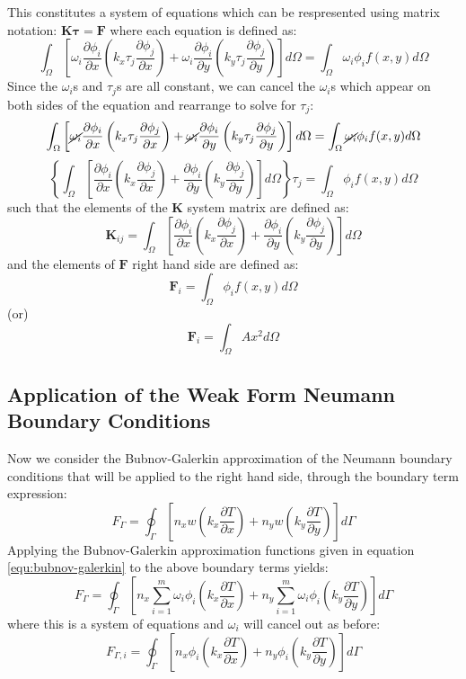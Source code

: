 \documentclass[letterpaper,10pt]{article}
\begin{document}
\noindent This constitutes a system of equations which can be respresented using matrix notation: $\mathbf{K}\mathbf{\tau}=\mathbf{F}$ where each equation is defined as:
\[
\int_\Omega \left[ \omega_i\frac{\partial \phi_i}{\partial x}\left(k_x\tau_j\frac{\partial \phi_j}{\partial x}\right) +  \omega_i\frac{\partial \phi_i}{\partial y}\left(k_y\tau_j\frac{\partial \phi_j}{\partial y}\right) \right]d\Omega = \int_\Omega \omega_i\phi_if(x,y)d\Omega
\]
Since the $\omega_i$s and $\tau_j$s are all constant, we can cancel the $\omega_i$s which appear on both sides of the equation and rearrange to solve for $\tau_j$:
\[
\int_\Omega \left[ \cancel{\omega_i}\frac{\partial \phi_i}{\partial x}\left(k_x\tau_j\frac{\partial \phi_j}{\partial x}\right) +  \cancel{\omega_i}\frac{\partial \phi_i}{\partial y}\left(k_y\tau_j\frac{\partial \phi_j}{\partial y}\right) \right]d\Omega = \int_\Omega \cancel{\omega_i}\phi_if(x,y)d\Omega
\]
\[
\left\{\int_\Omega \left[ \frac{\partial \phi_i}{\partial x}\left(k_x\frac{\partial \phi_j}{\partial x}\right) + \frac{\partial \phi_i}{\partial y}\left(k_y\frac{\partial \phi_j}{\partial y}\right) \right]d\Omega\right\}\tau_j = \int_\Omega \phi_if(x,y)d\Omega
\]
\noindent such that the elements of the $\mathbf{K}$ system matrix are defined as:
\begin{equation}
\label{equ:Kij}
\boxed{\mathbf{K}_{ij} = \int_\Omega \left[ \frac{\partial \phi_i}{\partial x}\left(k_x\frac{\partial \phi_j}{\partial x}\right) + \frac{\partial \phi_i}{\partial y}\left(k_y\frac{\partial \phi_j}{\partial y}\right) \right]d\Omega}
\end{equation}
\noindent and the elements of $\mathbf{F}$ right hand side are defined as:
\begin{equation}
\label{equ:Fi}
\boxed{\mathbf{F}_i = \int_\Omega \phi_if(x,y)d\Omega}
\end{equation}
(or)
\[\mathbf{F}_i = \int_\Omega Ax^2d\Omega\]

\subsection{Application of the Weak Form Neumann Boundary Conditions}
Now we consider the Bubnov-Galerkin approximation of the Neumann boundary conditions that will be applied to the right hand side, through the boundary term expression:
\[
F_\Gamma = \oint_\Gamma \left[n_xw\left(k_x\frac{\partial T}{\partial x}\right) + n_yw\left(k_y\frac{\partial T}{\partial y}\right)\right]d\Gamma
\]
\noindent Applying the Bubnov-Galerkin approximation functions given in equation \ref{equ:bubnov-galerkin} to the above boundary terms yields:
\[
F_\Gamma = \oint_\Gamma \left[n_x\displaystyle\sum\limits_{i=1}^m\omega_i\phi_i\left(k_x\frac{\partial T}{\partial x}\right) + n_y\displaystyle\sum\limits_{i=1}^m\omega_i\phi_i\left(k_y\frac{\partial T}{\partial y}\right)\right]d\Gamma
\]
\noindent where this is a system of equations and $\omega_i$ will cancel out as before:
\[
F_{\Gamma,i} = \oint_\Gamma \left[n_x\phi_i\left(k_x\frac{\partial T}{\partial x}\right) + n_y\phi_i\left(k_y\frac{\partial T}{\partial y}\right)\right]d\Gamma
\]
\end{document}
